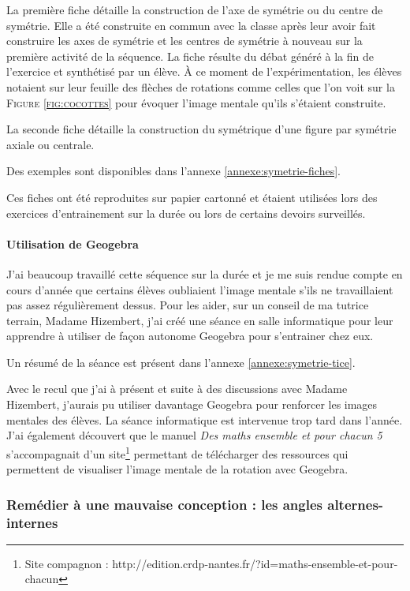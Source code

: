 La première fiche détaille la construction de l'axe de symétrie ou du centre de symétrie. Elle a été construite en commun avec la classe après leur avoir fait construire les axes de symétrie et les centres de symétrie à nouveau sur la première activité de la séquence. La fiche résulte du débat généré à la fin de l'exercice et synthétisé par un élève. À ce moment de l'expérimentation, les élèves notaient sur leur feuille des flèches de rotations comme celles que l'on voit sur la \textsc{Figure \ref{fig:cocottes}} pour évoquer l'image mentale qu'ils s'étaient construite.

La seconde fiche détaille la construction du symétrique d'une figure par symétrie axiale ou centrale.

Des exemples sont disponibles dans l'annexe \ref{annexe:symetrie-fiches}.

Ces fiches ont été reproduites sur papier cartonné et étaient utilisées lors des exercices d'entrainement sur la durée ou lors de certains devoirs surveillés.

\paragraph{Utilisation de Geogebra}

J'ai beaucoup travaillé cette séquence sur la durée et je me suis rendue compte en cours d'année que certains élèves oubliaient l'image mentale s'ils ne travaillaient pas assez régulièrement dessus. Pour les aider, sur un conseil de ma tutrice terrain, Madame Hizembert, j'ai créé une séance en salle informatique pour leur apprendre à utiliser de façon autonome Geogebra pour s'entrainer chez eux. 

Un résumé de la séance est présent dans l'annexe \ref{annexe:symetrie-tice}.

Avec le recul que j'ai à présent et suite à des discussions avec Madame Hizembert, j'aurais pu utiliser davantage Geogebra pour renforcer les images mentales des élèves. La séance informatique est intervenue trop tard dans l'année. J'ai également découvert que le manuel \textit{Des maths ensemble et pour chacun 5} s'accompagnait d'un site\footnote{Site compagnon : http://edition.crdp-nantes.fr/?id=maths-ensemble-et-pour-chacun} permettant de télécharger des ressources qui permettent de visualiser l'image mentale de la rotation avec Geogebra.

\subsubsection{Remédier à une mauvaise conception : les angles alternes-internes}

